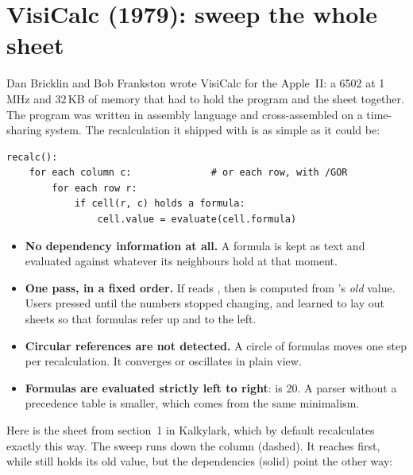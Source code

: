 \documentclass[11pt]{article}
\begin{document}
\section{VisiCalc (1979): sweep the whole sheet}

Dan Bricklin and Bob Frankston wrote VisiCalc for the Apple~II: a 6502 at
1\,MHz and 32\,KB of memory that had to hold the program and the sheet
together. The program was written in assembly language and cross-assembled
on a time-sharing system. The recalculation it shipped with is as simple as
it could be:

\begin{lstlisting}
recalc():
    for each column c:              # or each row, with /GOR
        for each row r:
            if cell(r, c) holds a formula:
                cell.value = evaluate(cell.formula)
\end{lstlisting}

\begin{itemize}
\item \textbf{No dependency information at all.} A formula is kept as text
  and evaluated against whatever its neighbours hold at that moment.
\item \textbf{One pass, in a fixed order.} If  reads ,
  then  is computed from 's \emph{old} value. Users
  pressed \typ{!} until the numbers stopped changing, and learned to lay
  out sheets so that formulas refer up and to the left.
\item \textbf{Circular references are not detected.} A circle of formulas
  moves one step per recalculation. It converges or oscillates in plain
  view.
\item \textbf{Formulas are evaluated strictly left to right}: 
  is 20. A parser without a precedence table is smaller, which comes from
  the same minimalism.
\end{itemize}

Here is the sheet from section~1 in Kalkylark, which by default
recalculates exactly this way. The sweep runs down the column (dashed). It
reaches  first, while  still holds its old value, but
the dependencies (solid) point the other way:

\begin{center}
\end{center}
\end{document}
